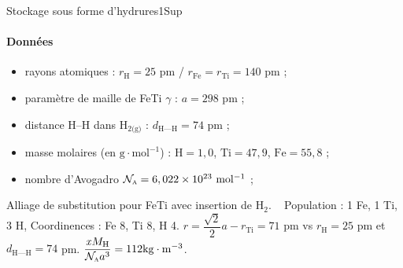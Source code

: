 \begin{exercise}{Stockage sous forme d'hydrures}{1}{Sup}
\paragraph{Données}
\begin{itemize}
    \item rayons atomiques : $r_\text{H} = 25$ pm / $r_\text{Fe} = r_\text{Ti} = 140$ pm ;
    \item paramètre de maille de FeTi $\gamma$ : $a = 298$ pm ;
    \item distance H--H dans H$_{2\text{(g)}}$ : $d_\text{H---H} = 74$ pm ;
    \item masse molaires (en $\mathrm{g\cdot mol^{-1}}$) : $\text{H} = 1,0$, $\text{Ti} = 47,9$, $\text{Fe} = 55,8$ ; 
    \item nombre d'Avogadro $\cal{N}_\textsc{a} = 6,022\times 10^{23}~\mathrm{mol^{-1}}$ ;
\end{itemize}
\end{exercise}

\begin{solution}
\begin{questions}
    \question Alliage de substitution pour FeTi avec insertion de H$_2$.
    \question ~
    \question Population : 1 Fe, 1 Ti, 3 H, Coordinences : Fe 8, Ti 8, H 4.
    \question $r = \dfrac{\sqrt{2}}{2}a - r_\text{Ti} = 71$ pm vs $r_\text{H} = 25$ pm et $d_\text{H---H} = 74$ pm.
    \question $\dfrac{\mathit{x} M_\text{H}}{\cal{N}_\textsc{a} a^3} = 112 \mathrm{kg\cdot m^{-3}}$.
\end{questions}
\end{solution}



